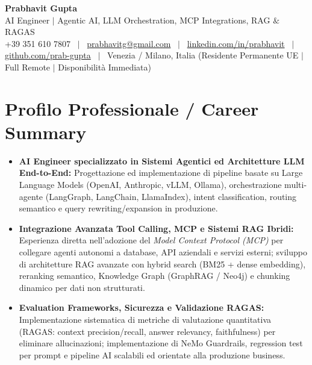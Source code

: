 \documentclass[a4paper,10pt]{article}
\begin{document}
\begin{minipage}[c]{0.80\textwidth}
  {\Huge\bfseries Prabhavit Gupta}\\[3pt]
  {\color{accent}\large AI Engineer $\vert$ Agentic AI, LLM Orchestration, MCP Integrations, RAG $\&$ RAGAS}\\[6pt]
  {\footnotesize +39 351 610 7807 ~$\vert$~
  \href{mailto:prabhavitg@gmail.com}{prabhavitg@gmail.com} ~$\vert$~
  \href{https://www.linkedin.com/in/prabhavit/}{linkedin.com/in/prabhavit} ~$\vert$~
  \href{https://github.com/prab-gupta}{github.com/prab-gupta} ~$\vert$~
  Venezia / Milano, Italia (Residente Permanente UE $\vert$ Full Remote $\vert$ Disponibilità Immediata)}
\end{minipage}\hfill

\vspace{6pt}

\section{Profilo Professionale / Career Summary}
\begin{itemize}
  \item \textbf{AI Engineer specializzato in Sistemi Agentici ed Architetture LLM End-to-End:} Progettazione ed implementazione di pipeline basate su Large Language Models (OpenAI, Anthropic, vLLM, Ollama), orchestrazione multi-agente (LangGraph, LangChain, LlamaIndex), intent classification, routing semantico e query rewriting/expansion in produzione.
  \item \textbf{Integrazione Avanzata Tool Calling, MCP e Sistemi RAG Ibridi:} Esperienza diretta nell'adozione del \textit{Model Context Protocol (MCP)} per collegare agenti autonomi a database, API aziendali e servizi esterni; sviluppo di architetture RAG avanzate con hybrid search (BM25 + dense embedding), reranking semantico, Knowledge Graph (GraphRAG / Neo4j) e chunking dinamico per dati non strutturati.
  \item \textbf{Evaluation Frameworks, Sicurezza e Validazione RAGAS:} Implementazione sistematica di metriche di valutazione quantitativa (RAGAS: context precision/recall, answer relevancy, faithfulness) per eliminare allucinazioni; implementazione di NeMo Guardrails, regression test per prompt e pipeline AI scalabili ed orientate alla produzione business.
\end{itemize}

\end{document}
